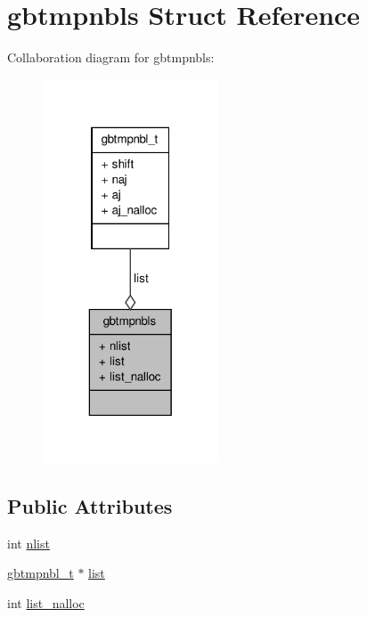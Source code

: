 \hypertarget{structgbtmpnbls}{\section{gbtmpnbls \-Struct \-Reference}
\label{structgbtmpnbls}
}


\-Collaboration diagram for gbtmpnbls\-:
\nopagebreak
\begin{figure}[H]
\begin{center}
\leavevmode
\includegraphics[width=148pt]{structgbtmpnbls__coll__graph}
\end{center}
\end{figure}
\subsection*{\-Public \-Attributes}
\begin{DoxyCompactItemize}
\item 
int \hyperlink{structgbtmpnbls_aa28c407bff14afd6e0bce3e73d1113b3}{nlist}
\item 
\hyperlink{structgbtmpnbl__t}{gbtmpnbl\-\_\-t} $\ast$ \hyperlink{structgbtmpnbls_a4ee7381816706cd6097d8e2fac14517c}{list}
\item 
int \hyperlink{structgbtmpnbls_abbace6b246b8c5f96278672ab38c3be4}{list\-\_\-nalloc}
\end{DoxyCompactItemize}


